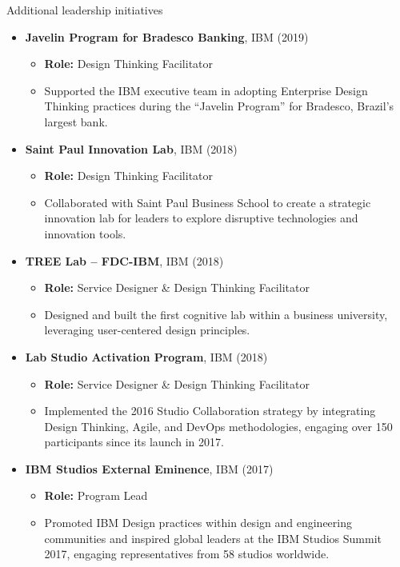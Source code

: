 \documentclass{resume} %
\begin{document}
\begin{rSection}{Additional leadership initiatives}
\begin{itemize}
    \item \textbf{Javelin Program for Bradesco Banking}, \hfill IBM (2019) 
    \begin{itemize}
        \item \textbf{Role:} Design Thinking Facilitator
        \item Supported the IBM executive team in adopting Enterprise Design Thinking practices during the “Javelin Program” for Bradesco, Brazil's largest bank.
    \end{itemize}
    
    \item \textbf{Saint Paul Innovation Lab}, \hfill IBM (2018) 
    \begin{itemize}
        \item \textbf{Role:} Design Thinking Facilitator
        \item Collaborated with Saint Paul Business School to create a strategic innovation lab for leaders to explore disruptive technologies and innovation tools.
    \end{itemize}
    
    \item \textbf{TREE Lab – FDC-IBM}, \hfill IBM (2018) 
    \begin{itemize}
        \item \textbf{Role:} Service Designer \& Design Thinking Facilitator
        \item Designed and built the first cognitive lab within a business university, leveraging user-centered design principles.
    \end{itemize}
    
    \item \textbf{Lab Studio Activation Program}, \hfill IBM (2018) 
    \begin{itemize}
        \item \textbf{Role:} Service Designer \& Design Thinking Facilitator
        \item Implemented the 2016 Studio Collaboration strategy by integrating Design Thinking, Agile, and DevOps methodologies, engaging over 150 participants since its launch in 2017.
    \end{itemize}
    
    \item \textbf{IBM Studios External Eminence}, \hfill IBM (2017) 
    \begin{itemize}
        \item \textbf{Role:} Program Lead
        \item Promoted IBM Design practices within design and engineering communities and inspired global leaders at the IBM Studios Summit 2017, engaging representatives from 58 studios worldwide.
    \end{itemize}
    

\end{itemize}
\end{rSection}
\end{document}
